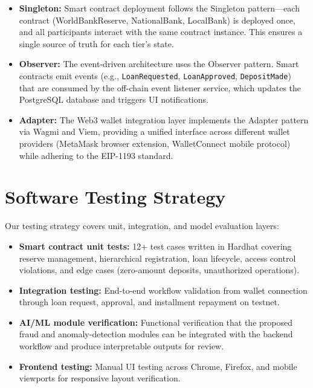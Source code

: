 \documentclass[12pt,a4paper]{report}
\begin{document}
\begin{itemize}[noitemsep]
\item \textbf{Singleton:} Smart contract deployment follows the Singleton pattern---each contract (WorldBankReserve, NationalBank, LocalBank) is deployed once, and all participants interact with the same contract instance. This ensures a single source of truth for each tier's state.

\item \textbf{Observer:} The event-driven architecture uses the Observer pattern. Smart contracts emit events (e.g., \texttt{LoanRequested}, \texttt{LoanApproved}, \texttt{DepositMade}) that are consumed by the off-chain event listener service, which updates the PostgreSQL database and triggers UI notifications.

\item \textbf{Adapter:} The Web3 wallet integration layer implements the Adapter pattern via Wagmi and Viem, providing a unified interface across different wallet providers (MetaMask browser extension, WalletConnect mobile protocol) while adhering to the EIP-1193 standard.
\end{itemize}


\section{Software Testing Strategy}

Our testing strategy covers unit, integration, and model evaluation layers:

\begin{itemize}[noitemsep]
\item \textbf{Smart contract unit tests:} 12+ test cases written in Hardhat covering reserve management, hierarchical registration, loan lifecycle, access control violations, and edge cases (zero-amount deposits, unauthorized operations).
\item \textbf{Integration testing:} End-to-end workflow validation from wallet connection through loan request, approval, and installment repayment on testnet.
\item \textbf{AI/ML module verification:} Functional verification that the proposed fraud and anomaly-detection modules can be integrated with the backend workflow and produce interpretable outputs for review.
\item \textbf{Frontend testing:} Manual UI testing across Chrome, Firefox, and mobile viewports for responsive layout verification.
\end{itemize}
\end{document}
